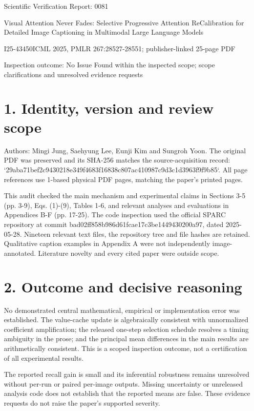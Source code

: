 \documentclass[10pt]{article}
\begin{document}
Scientific Verification Report: 0081\par
Visual Attention Never Fades: Selective Progressive Attention ReCalibration for Detailed Image Captioning in Multimodal Large Language Models\par
I25-43450ICML 2025, PMLR 267:28527-28551; publisher-linked 25-page PDF\par
Inspection outcome: No Issue Found within the inspected scope; scope clarifications and unresolved evidence requests\par
\section*{1. Identity, version and review scope}
Authors: Mingi Jung, Saehyung Lee, Eunji Kim and Sungroh Yoon. The original PDF was preserved and its SHA-256 matches the source-acquisition record: `29aba71bef2c9430218e349f4683f16838c807ac410987c9d3c1d3963f9f9b85`. All page references use 1-based physical PDF pages, matching the paper’s printed pages.\par
This audit checked the main mechanism and experimental claims in Sections 3-5 (pp. 3-9), Eqs. (1)-(9), Tables 1-6, and relevant analyses and evaluations in Appendices B-F (pp. 17-25). The code inspection used the official SPARC repository at commit bad02ff858b986d61fcae17c3be1449430200a97, dated 2025-05-28. Nineteen relevant text files, the repository tree and file hashes are retained. Qualitative caption examples in Appendix A were not independently image-annotated. Literature novelty and every cited paper were outside scope.\par
\section*{2. Outcome and decisive reasoning}
No demonstrated central mathematical, empirical or implementation error was established. The value-cache update is algebraically consistent with unnormalized coefficient amplification; the released one-step selection schedule resolves a timing ambiguity in the prose; and the principal mean differences in the main results are arithmetically consistent. This is a scoped inspection outcome, not a certification of all experimental results.\par
The reported recall gain is small and its inferential robustness remains unresolved without per-run or paired per-image outputs. Missing uncertainty or unreleased analysis code does not establish that the reported means are false. These evidence requests do not raise the paper’s supported severity.\par
\end{document}

